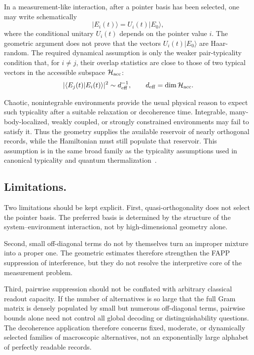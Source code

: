\documentclass[aps,pra,reprint,superscriptaddress,nofootinbib,longbibliography]{revtex4-2}
\newcommand{\ket}[1]{| #1 \rangle}
\begin{document}
In a measurement-like interaction, after a pointer basis has been selected, one may write schematically
\begin{equation}
    \ket{E_i(t)}
    =
    U_i(t)\ket{E_0},
\end{equation}
where the conditional unitary $U_i(t)$ depends on the pointer value $i$. The geometric argument does not prove that the vectors $U_i(t)\ket{E_0}$ are Haar-random. The required dynamical assumption is only the weaker pair-typicality condition that, for $i\ne j$, their overlap statistics are close to those of two typical vectors in the accessible subspace $\mathcal H_{\rm acc}$:
\begin{equation}
    |\langle E_j(t)|E_i(t)\rangle|^2
    \sim
    d_{\rm eff}^{-1},
    \qquad
    d_{\rm eff}=\dim\mathcal H_{\rm acc}.
\end{equation}

Chaotic, nonintegrable environments provide the usual physical reason to expect such typicality after a suitable relaxation or decoherence time. Integrable, many-body-localized, weakly coupled, or strongly constrained environments may fail to satisfy it. Thus the geometry supplies the available reservoir of nearly orthogonal records, while the Hamiltonian must still populate that reservoir. This assumption is in the same broad family as the typicality assumptions used in canonical typicality and quantum thermalization~\cite{popescu2006entanglement,goldstein2006canonical,reimann2008foundation,rigol2008thermalization,dalessio2016quantum}.

\subsection*{Limitations.}

Two limitations should be kept explicit. First, quasi-orthogonality
does not select the pointer basis. The preferred basis is determined
by the structure of the system--environment interaction, not by
high-dimensional geometry alone.

 Second, small off-diagonal terms do
not by themselves turn an improper mixture into a proper one. The
geometric estimates therefore strengthen the FAPP suppression of
interference, but they do not resolve the interpretive core of the
measurement problem.

Third, pairwise suppression should not be conflated with arbitrary classical
readout capacity. If the number of alternatives is so large that the full Gram
matrix is densely populated by small but numerous off-diagonal terms, pairwise
bounds alone need not control all global decoding or distinguishability
questions. The decoherence application therefore concerns fixed, moderate, or
dynamically selected families of macroscopic alternatives, not an exponentially
large alphabet of perfectly readable records.
\end{document}
